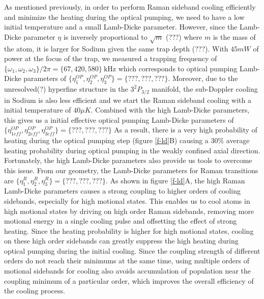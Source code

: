 \documentclass[aps,prl,twocolumn,groupedaddress]{revtex4-1}
\begin{document}
As mentioned previously, in order to perform Raman sideband cooling efficiently and
minimize the heating during the optical pumping, we need to have a low initial temperature and
a small Lamb-Dicke parameter. However, since the Lamb-Dicke parameter $\eta$ is inversely
proportional to $\sqrt{m}$ (???) where $m$ is the mass of the atom, it is larger for Sodium
given the same trap depth (???).
With $45mW$ of power at the focus of the trap, we measured a trapping frequency of
$\{\omega_1,\omega_2,\omega_3\}/2\pi = \{67, 420, 580\}\ \text{kHz}$
which corresponds to optical pumping Lamb-Dicke parameters of
$\{\eta^{OP}_1,\eta^{OP}_2,\eta^{OP}_3\} = \{???, ???, ???\}$.
Moreover, due to the unresolved(?) hyperfine structure in the $3^2P_{3/2}$ manifold,
the sub-Doppler cooling in Sodium is also less efficient and we start the
Raman sideband cooling with a initial temperature of $40\mu K$. Combined with the high Lamb-Dicke
parameters, this gives us a initial effective optical pumping Lamb-Dicke parameters of
$\{\eta^{OP}_{1eff},\eta^{OP}_{2eff},\eta^{OP}_{3eff}\} = \{???, ???, ???\}$
As a result, there is a very high probability of heating during the optical pumping step
(figure \ref{f-ld}B) causing a $30\%$ average heating probability during optical pumping
in the weakly confined axial direction. Fortunately, the high Lamb-Dicke parameters also
provide us tools to overcome this issue. From our geometry, the Lamb-Dicke parameters for
Raman transitions are $\{\eta^R_{1},\eta^R_{2},\eta^R_{3}\} = \{???, ???, ???\}$. As shown in
figure \ref{f-ld}A, the high Raman Lamb-Dicke parameters causes a strong coupling to higher orders
of cooling sidebands, especially for high motional states.
This enables us to cool atoms in high motional states by driving on high order Raman sidebands,
removing more motional energy in a single cooling pulse and offsetting the effect of
strong heating. Since the heating probability is higher for high motional states,
cooling on these high order sidebands can greatly suppress the high heating during
optical pumping during the initial cooling. Since the coupling strength of different orders
do not reach their minimums at the same time, using multiple orders of motional sidebands
for cooling also avoids accumulation of population near the coupling minimum of a particular
order, which improves the overall efficiency of the cooling process.
\end{document}
